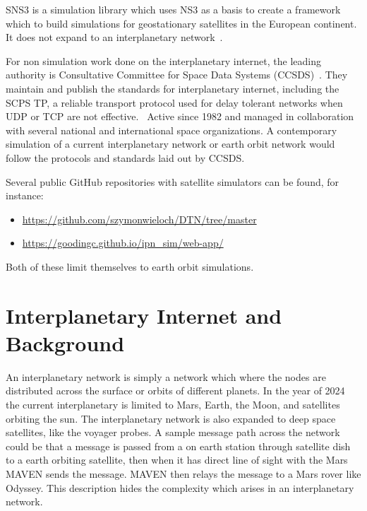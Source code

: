 \documentclass[a4paper,12pt]{article}
\begin{document}
SNS3 is a simulation library which uses NS3 as a basis to create a framework
which to build simulations for geostationary satellites in the European
continent. It does not expand to an interplanetary network~\cite{Puttonen2014}.

For non simulation work done on the interplanetary internet, the leading
authority is Consultative Committee for Space Data Systems
(CCSDS)~\cite{CCSDS.org}. They maintain and publish the standards for
interplanetary internet, including the SCPS TP, a reliable transport protocol
used for delay tolerant networks when UDP or TCP are not
effective.~\cite{Keith2004} Active since 1982 and managed in collaboration with
several national and international space organizations. A contemporary
simulation of a current interplanetary network or earth orbit network would
follow the protocols and standards laid out by CCSDS.

Several public GitHub repositories with satellite simulators can be
found, for instance:
\begin{itemize}
\item\url{https://github.com/szymonwieloch/DTN/tree/master}
\item\url{https://goodingc.github.io/ipn_sim/web-app/}
\end{itemize}
Both of these limit themselves to earth orbit simulations.

\section{Interplanetary Internet and Background}

An interplanetary network is simply a network which where the nodes are
distributed across the surface or orbits of different planets. In the year of
2024 the current interplanetary is limited to Mars, Earth, the Moon, and
satellites orbiting the sun. The interplanetary network is also expanded to deep
space satellites, like the voyager probes. A sample message path across the
network could be that a message is passed from a on earth station through
satellite dish to a earth orbiting satellite, then when it has direct line of
sight with the Mars MAVEN sends the message. MAVEN then relays the message to a
Mars rover like Odyssey. This description hides the complexity which arises in
an interplanetary network.
\end{document}
